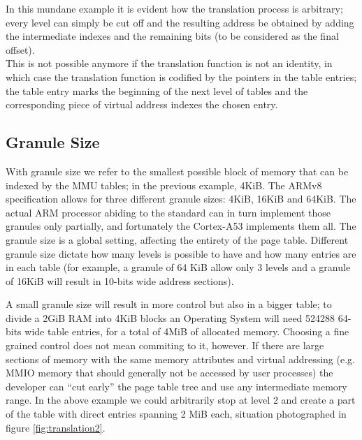 \documentclass[12pt,a4paper,openright,twoside]{report}
\begin{document}
In this mundane example it is evident how the translation process is arbitrary;
every level can simply be cut off and the resulting address be obtained by adding
the intermediate indexes and the remaining bits (to be considered as the final 
offset).\\
This is not possible anymore if the translation function is not an identity,
in which case the translation function is codified by the pointers in the table entries;
the table entry marks the beginning of the next level of tables and the corresponding
piece of virtual address indexes the chosen entry.

\subsection{Granule Size}
\label{translationsize}
With granule size we refer to the smallest possible block of memory that can be 
indexed by the MMU tables; in the previous example, 4KiB.
The ARMv8 specification allows for three different granule sizes: 4KiB, 16KiB and 64KiB.
The actual ARM processor abiding to the standard can in turn implement those granules
only partially, and fortunately the Cortex-A53 implements them all.
The granule size is a global setting, affecting the entirety of the page table.
Different granule size dictate how many levels is possible to have and how many
entries are in each table (for example, a granule of 64 KiB allow only 3 levels
and a granule of 16KiB will result in 10-bits wide address sections).

A small granule size will result in more control but also in a bigger table; to 
divide a 2GiB RAM into 4KiB blocks an Operating System will need 524288 64-bits
wide table entries, for a total of 4MiB of allocated memory.
Choosing a fine grained control does not mean commiting to it, however. If there
are large sections of memory with the same memory attributes and virtual addressing
(e.g. MMIO memory that should generally not be accessed by user processes) the 
developer can ``cut early'' the page table tree and use any intermediate memory
range. In the above example we could arbitrarily stop at level 2 and create a part
of the table with direct entries spanning 2 MiB each, situation photographed in
figure \ref{fig:translation2}.
\end{document}
